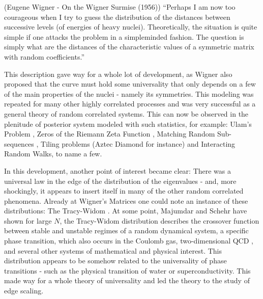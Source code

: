 \begin{sic}
	(Eugene Wigner - On the Wigner Surmise (1956))
	“Perhaps I am now too courageous when I try to guess the distribution of the distances between successive levels (of energies of heavy nuclei). Theoretically, the situation is quite simple if one attacks the problem in a simpleminded fashion. The question is simply what are the distances of the characteristic values of a symmetric matrix with random coefficients.” 
\end{sic}

This description gave way for a whole lot of development, as Wigner also proposed that the curve must hold some universality that only depends on a few of the main properties of the nuclei - namely its symmetries. This modeling was repeated for many other highly correlated processes and was very successful as a general theory of random correlated systems. This can now be observed in the plenitude of posterior system modeled with such statistics, for example: Ulam's Problem \cite{Ulam}, Zeros of the Riemann Zeta Function \cite{Montgomery}, Matching Random Sub-sequences \cite{majumdar2007randommatricesulamproblem}, Tiling problems (Aztec Diamond for instance) and Interacting Random Walks, to name a few. 

In this development, another point of interest became clear: There was a universal law in the edge of the distribution of the eigenvalues - and, more shockingly, it appears to insert itself in many of the other random correlated phenomena. Already at Wigner's Matrices one could note an instance of these distributions: The Tracy-Widom \cite{Tracy_1993}. At some point, Majumdar and Schehr have shown for large $N$, the Tracy-Widom distribution describes the crossover function between stable and unstable regimes of a random dynamical system, a specific phase transition, which also occurs in the Coulomb gas, two-dimensional QCD \cite{Kieburg_2014}, and several other systems of mathematical and physical interest. This distribution appears to be somehow related to the universality of phase transitions - such as the physical transition of water or superconductivity. This made way for a whole theory of universality and led the theory to the study of edge scaling.

